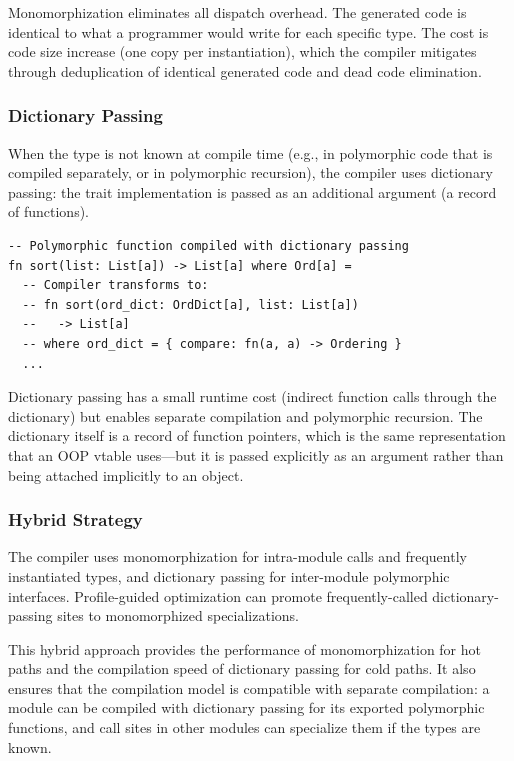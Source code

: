 \documentclass[11pt,a4paper]{article}
\begin{document}
Monomorphization eliminates all dispatch overhead. The generated code is identical to what a programmer would write for each specific type. The cost is code size increase (one copy per instantiation), which the compiler mitigates through deduplication of identical generated code and dead code elimination.

\subsubsection{Dictionary Passing}

When the type is not known at compile time (e.g., in polymorphic code that is compiled separately, or in polymorphic recursion), the compiler uses dictionary passing: the trait implementation is passed as an additional argument (a record of functions).

\begin{lstlisting}
-- Polymorphic function compiled with dictionary passing
fn sort(list: List[a]) -> List[a] where Ord[a] =
  -- Compiler transforms to:
  -- fn sort(ord_dict: OrdDict[a], list: List[a])
  --   -> List[a]
  -- where ord_dict = { compare: fn(a, a) -> Ordering }
  ...
\end{lstlisting}

Dictionary passing has a small runtime cost (indirect function calls through the dictionary) but enables separate compilation and polymorphic recursion. The dictionary itself is a record of function pointers, which is the same representation that an OOP vtable uses---but it is passed explicitly as an argument rather than being attached implicitly to an object.

\subsubsection{Hybrid Strategy}

The compiler uses monomorphization for intra-module calls and frequently instantiated types, and dictionary passing for inter-module polymorphic interfaces. Profile-guided optimization can promote frequently-called dictionary-passing sites to monomorphized specializations.

This hybrid approach provides the performance of monomorphization for hot paths and the compilation speed of dictionary passing for cold paths. It also ensures that the compilation model is compatible with separate compilation: a module can be compiled with dictionary passing for its exported polymorphic functions, and call sites in other modules can specialize them if the types are known.
\end{document}
